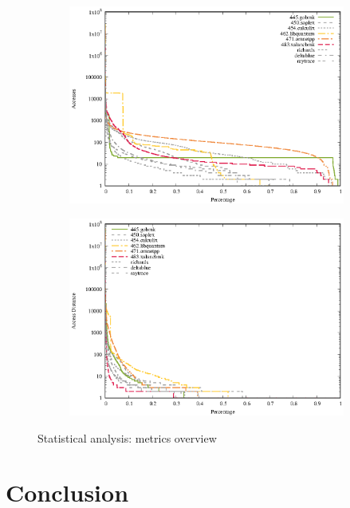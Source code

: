 \documentclass[onecolumn, openright, master, english, signatures]{dbrgrptt}
\begin{document}
\begin{figure}[!ht]
\begin{subfigure}[b]{0.5\textwidth}
    \includegraphics[width=\textwidth]{figs/statistical-analysis/plots/aa.eps}
    \label{fig:stats-accesses}
  \end{subfigure}
  \begin{subfigure}[b]{0.5\textwidth}%
    \includegraphics[width=\textwidth]{figs/statistical-analysis/plots/ad.eps}
    \label{fig:stats-access-distance}
  \end{subfigure}
  \caption{Statistical analysis: metrics overview}
  \label{fig:stats-overview}
\end{figure}

\section{Conclusion}\label{sec:exp-conclusion}
\end{document}
